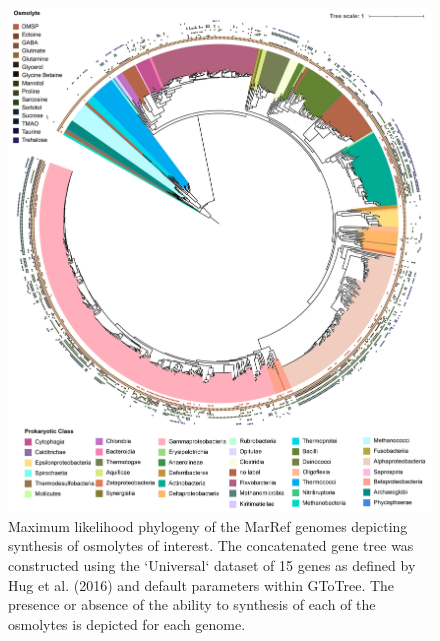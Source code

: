 \documentclass[utf8]{frontiers_suppmat} %
\begin{document}
\begin{figure}[ht]
    \centering
    \includegraphics[width=0.9\columnwidth]{Figures/SI-Bacterial-Phylogeny-Synthesis-01-01.png}
    \caption{Maximum likelihood phylogeny of the MarRef genomes depicting synthesis of osmolytes of interest. The concatenated gene tree was constructed using the `Universal` dataset of 15 genes as defined by Hug et al. (2016) and default parameters within GToTree. The presence or absence of the ability to synthesis of each of the osmolytes is depicted for each genome.
}
    \label{fig:physyn}
\end{figure}
\end{document}
